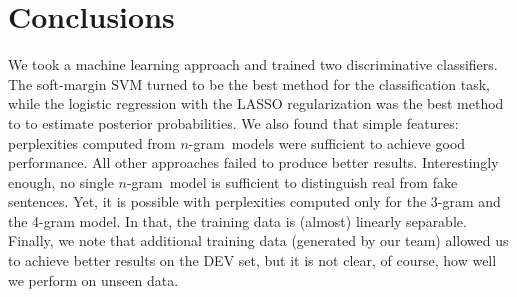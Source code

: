 \documentclass[11pt]{article}
\newcommand{\ngram}{\mbox{$n$-gram }}
\begin{document}
\section{Conclusions}
We took a machine learning approach and trained two discriminative classifiers. 
The soft-margin SVM turned to be the best method for the classification task,
while the logistic regression with the LASSO regularization was
the best method to to estimate posterior probabilities.
We also found that simple features: perplexities computed from \ngram models were sufficient to achieve good performance.
All other approaches failed to produce better results.
Interestingly enough, no single \ngram model is sufficient to distinguish real from fake sentences.
Yet, it is possible with perplexities computed only for the 3-gram and the 4-gram model. In that,
the training data is (almost) linearly separable.
Finally, we note that additional training data (generated by our team) allowed us to achieve better 
results on the DEV set, but it is not clear, of course, how well we perform on unseen data.



\end{document}
